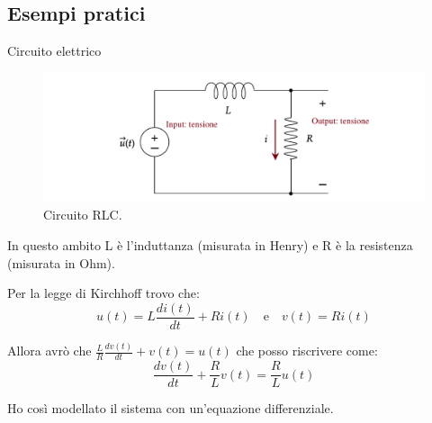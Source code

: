 \subsection{Esempi pratici}
\begin{nexample}
	Circuito elettrico
	
		\begin{figure}[H]
			\centering
			\includegraphics[scale=0.75]{immagini/cap3_Sistemi/circuito_RLC}
			\caption{ Circuito RLC. }
			\label{fig: circuito_RLC}
		\end{figure}
	 	In questo ambito L è l'induttanza (misurata in Henry) e R è la resistenza (misurata in Ohm). 
 	
	 	Per la legge di Kirchhoff trovo che: 
	 	\[ u(t) = L \frac{di(t)}{dt} + R i(t) \quad \text{e} \quad v(t) = R i(t) \]
	 	
	 	Allora avrò che $ \frac{L}{R} \frac{dv(t)}{dt} + v(t) = u(t)$ che posso riscrivere come:
	 	  \[ \frac{dv(t)}{dt} + \frac{R}{L} v(t) = \frac{R}{L} u(t) \]
	 	  
	 	Ho così modellato il sistema con un'equazione differenziale.
\end{nexample}

